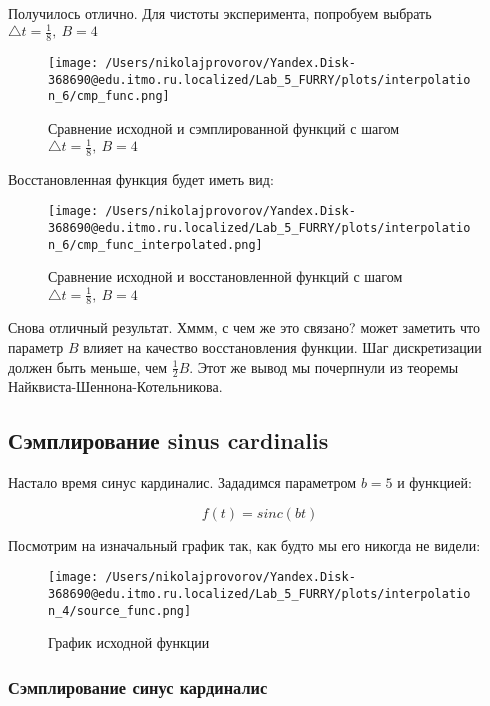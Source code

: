Получилось отлично. Для чистоты эксперимента, попробуем выбрать $\triangle t = \frac{1}{8},~ B = 4$

\clearpage

\begin{figure}[ht!]
    \centering
    \texttt{[image: /Users/nikolajprovorov/Yandex.Disk-368690@edu.itmo.ru.localized/Lab\_5\_FURRY/plots/interpolation\_6/cmp\_func.png]}
    \caption{Сравнение исходной и сэмплированной функций с шагом $\triangle t = \frac{1}{8},~ B = 4$}
\end{figure}

Восстановленная функция будет иметь вид:

\begin{figure}[ht!]
    \centering
    \texttt{[image: /Users/nikolajprovorov/Yandex.Disk-368690@edu.itmo.ru.localized/Lab\_5\_FURRY/plots/interpolation\_6/cmp\_func\_interpolated.png]}
    \caption{Сравнение исходной и восстановленной функций с шагом $\triangle t = \frac{1}{8},~ B = 4$}
\end{figure}

Снова отличный результат. Хммм, с чем же это связано? может заметить что параметр $B$ влияет на качество восстановления функции. Шаг дискретизации должен быть меньше, чем $\frac{1}{2}B$. Этот же вывод мы почерпнули из теоремы Найквиста-Шеннона-Котельникова.

\clearpage

\subsection{Сэмплирование sinus cardinalis}

Настало время синус кардиналис. Зададимся параметром $b = 5$ и функцией:

\begin{equation}
    f(t) = sinc(bt)
\end{equation}

Посмотрим на изначальный график так, как будто мы его никогда не видели:

\begin{figure}[ht!]
    \centering
    \texttt{[image: /Users/nikolajprovorov/Yandex.Disk-368690@edu.itmo.ru.localized/Lab\_5\_FURRY/plots/interpolation\_4/source\_func.png]}
    \caption{График исходной функции}
\end{figure}

\clearpage

\subsubsection{Сэмплирование синус кардиналис}

